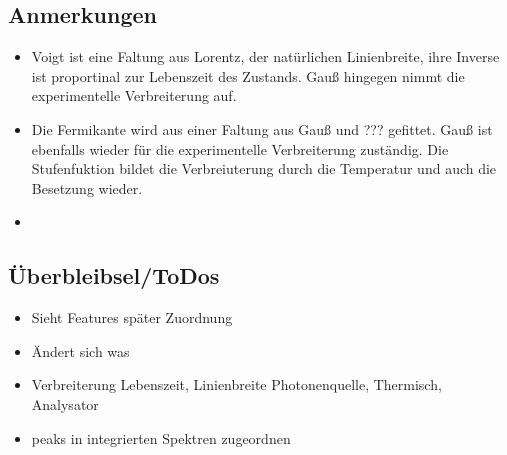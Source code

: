     \subsection{Anmerkungen}
    \begin{itemize}
        \item Voigt ist eine Faltung aus Lorentz, der natürlichen Linienbreite, ihre Inverse ist proportinal zur Lebenszeit des Zustands. Gauß hingegen nimmt die experimentelle Verbreiterung auf.
        \item Die Fermikante wird aus einer Faltung aus Gauß und ??? gefittet. Gauß ist ebenfalls wieder für die experimentelle Verbreiterung zuständig. Die Stufenfuktion bildet die Verbreiuterung durch die Temperatur und auch die Besetzung wieder.
        \item 
    \end{itemize}

    \subsection{Überbleibsel/ToDos}
    \begin{itemize}
        \item Sieht Features später Zuordnung
        \item Ändert sich was
        \item Verbreiterung Lebenszeit, Linienbreite Photonenquelle, Thermisch, Analysator
        \item peaks in integrierten Spektren zugeordnen
    \end{itemize}

